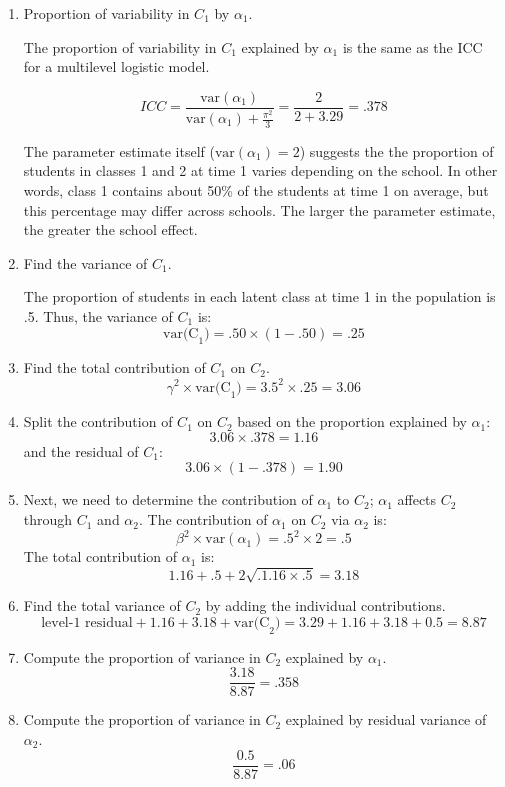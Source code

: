 \documentclass[man]{apa6}
\begin{document}
\begin{enumerate}
\item Proportion of variability in $C_1$ by $\alpha_1$.

The proportion of variability in $C_1$ explained by $\alpha_1$ is the same as the ICC for a multilevel logistic model. 

\[ ICC = \frac{\textrm{var}(\alpha_1)}{\textrm{var}(\alpha_1) + \frac{\pi^2}{3}} = \frac{2}{2 + 3.29} = .378\]

The parameter estimate itself ($\textrm{var}(\alpha_1)=2$) suggests the the proportion of students in classes 1 and 2 at time 1 varies depending on the school. In other words, class 1 contains about 50\% of the students at time 1 on average, but this percentage may differ across schools. The larger the parameter estimate, the greater the school effect. 

\item Find the variance of $C_1$. 

The proportion of students in each latent class at time 1 in the population is .5. Thus, the variance of $C_1$ is:
\[ \textrm{var(C}_1)=.50\times(1-.50) = .25 \]

\item Find the total contribution of $C_1$ on $C_2$.
\[ \gamma^2\times\textrm{var(C}_1)=3.5^2\times.25 = 3.06 \]

\item Split the contribution of $C_1$ on $C_2$ based on the proportion explained by $\alpha_1$:
\[ 3.06\times.378 = 1.16\]
and the residual of $C_1$:
\[ 3.06 \times (1-.378) = 1.90 \]

\item Next, we need to determine the contribution of $\alpha_1$ to $C_2$; $\alpha_1$ affects $C_2$ through $C_1$ and $\alpha_2$. The contribution of $\alpha_1$ on $C_2$ via $\alpha_2$ is:
\[ \beta^2\times\textrm{var}(\alpha_1)=.5^2\times2 = .5\]
The total contribution of $\alpha_1$ is:
\[ 1.16 + .5 +2\sqrt{.1.16\times.5}=3.18\]

\item Find the total variance of $C_2$ by adding the individual contributions.
\[ \textrm{level-1 residual} + 1.16 + 3.18 + \textrm{var(C}_2) = 3.29 + 1.16+ 3.18 + 0.5 = 8.87 \]

\item Compute the proportion of variance in $C_2$ explained by $\alpha_1$.
\[ \frac{3.18}{8.87} = .358 \]

\item Compute the proportion of variance in $C_2$ explained by residual variance of $\alpha_2$.
\[ \frac{0.5}{8.87} = .06 \]


\end{enumerate}
\end{document}
